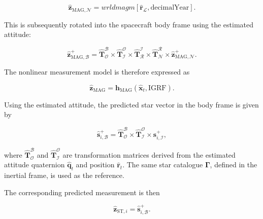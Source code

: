 \begin{equation}
    \hat{\mathbf{z}}_{\text{MAG},\mathcal{N}} = \textit{wrldmagm}[\hat{\mathbf{r}}_\mathcal{L}, \text{decimalYear}].
\end{equation}

\noindent This is subsequently rotated into the spacecraft body frame using the estimated attitude:

\begin{equation}
    \hat{\mathbf{z}}_{\text{MAG},\mathcal{B}}^+ = 
    \mathbf{\hat{T}}_\mathcal{O}^\mathcal{B} \times 
    \mathbf{\hat{T}}_\mathcal{I}^\mathcal{O} \times
    \mathbf{\hat{T}}_\mathcal{R}^\mathcal{I} \times
    \mathbf{\hat{T}}_\mathcal{N}^\mathcal{R} \times
    \hat{\mathbf{z}}_{\text{MAG},\mathcal{N}}^+.
\end{equation}

\noindent The nonlinear measurement model is therefore expressed as

\begin{equation}
    \mathbf{\hat{z}}_{\text{MAG}} = \mathbf{h}_{\text{MAG}}(\mathbf{\hat{x}}_t,\text{IGRF}).
\end{equation}

\label{sec:STMeasModel}

\noindent 
Using the estimated attitude, the predicted star vector in the body frame is given by

\begin{equation}
    \mathbf{\hat{s}}_{i,\mathcal{B}}^+ = 
    \mathbf{\hat{T}}^\mathcal{B}_\mathcal{O} \times \mathbf{\hat{T}}^\mathcal{O}_\mathcal{I} \times \mathbf{s}_{i,\mathcal{I}}^+,
\end{equation}

\noindent where $\mathbf{\hat{T}}^\mathcal{B}_\mathcal{O}$ and $\mathbf{\hat{T}}^\mathcal{O}_\mathcal{I}$ are transformation matrices derived from the 
estimated attitude quaternion $\mathbf{\hat{q}}_t$ and position $\mathbf{\hat{r}}_t$. The same star catalogue $\boldsymbol{\Gamma}$, defined in the inertial frame, is used as the reference.
\vspace{0.5cm}

\noindent The corresponding predicted measurement is then

\begin{equation}
    \mathbf{\hat{z}}_{\text{ST},i} = \mathbf{\hat{s}}_{i,\mathcal{B}}^+.
\end{equation}

